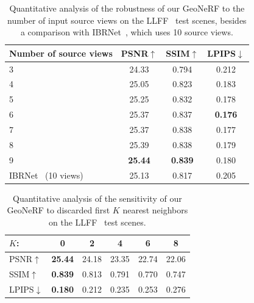 \begin{table}[t]
\begin{center}
        \begin{tabular}{l|ccc}
        \hline
        Number of source views & PSNR$\uparrow$ & SSIM$\uparrow$ & LPIPS$\downarrow$  \\
        \hline
        3 & 24.33 & 0.794 & 0.212  \\
        4 & 25.05 & 0.823 & 0.183  \\
        5 & 25.25 & 0.832 & 0.178  \\
        6  & 25.37 & 0.837 & \textbf{0.176} \\
        7 & 25.37 & 0.838 & 0.177  \\
        8 & 25.39 & 0.838 & 0.179  \\
        9 & \textbf{25.44} & \textbf{0.839} & 0.180  \\
        \hline
        IBRNet~\cite{wang2021ibrnet} (10 views) & 25.13 & 0.817 & 0.205  \\
        \hline
        \end{tabular}
    \end{center}
    \caption{Quantitative analysis of the robustness of our GeoNeRF to the number of input source views on the LLFF~\cite{mildenhall2019llff} test scenes, besides a comparison with IBRNet~\cite{wang2021ibrnet}, which uses 10 source views.}
    \label{table:n_views}
\end{table}

\begin{table}[t]
	\begin{center}
		\begin{tabular}{lccccc}
			\hline
			$K$: & 0 & 2 & 4 & 6 & 8\\
			\hline
			PSNR$\uparrow$ & \textbf{25.44} & 24.18 & 23.35 & 22.74 & 22.06 \\
			SSIM$\uparrow$ & \textbf{0.839} & 0.813 & 0.791 & 0.770 & 0.747 \\
			LPIPS$\downarrow$ & \textbf{0.180} & 0.212 & 0.235 & 0.253 & 0.276 \\
			\hline
		\end{tabular}
	\end{center}	
	\caption{Quantitative analysis of the sensitivity of our GeoNeRF to discarded first $K$ nearest neighbors on the LLFF~\cite{mildenhall2019llff} test scenes.}
	\label{table:discard_views}
\end{table}

